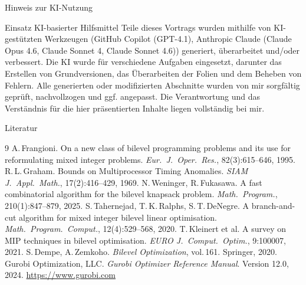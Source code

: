 \documentclass[fleqn,11pt,aspectratio=43]{beamer}
\begin{document}
\appendix

\begin{frame}{Hinweis zur KI-Nutzung}
  \begin{block}{Einsatz KI-basierter Hilfsmittel}
    Teile dieses Vortrags wurden mithilfe von KI-gestützten Werkzeugen (GitHub Copilot (GPT-4.1), Anthropic Claude (Claude Opus 4.6, Claude Sonnet 4, Claude Sonnet 4.6)) generiert, überarbeitet und/oder verbessert. Die KI wurde für verschiedene Aufgaben eingesetzt, darunter das Erstellen
    von Grundversionen, das Überarbeiten der Folien und dem Beheben von Fehlern.
    Alle generierten oder modifizierten Abschnitte wurden von mir sorgfältig geprüft, nachvollzogen und ggf.
    angepasst. Die Verantwortung und das Verständnis für die hier präsentierten Inhalte liegen vollständig bei mir.
  \end{block}
\end{frame}

\begin{frame}[allowframebreaks]{Literatur}
  \footnotesize
  \begin{thebibliography}{9}
      A.\,Frangioni. On a new class of bilevel programming problems and its use
      for reformulating mixed integer problems.
      \textit{Eur.~J.~Oper.~Res.}, 82(3):615--646, 1995.
      R.\,L.\,Graham. Bounds on Multiprocessor Timing Anomalies.
      \textit{SIAM J.\ Appl.\ Math.}, 17(2):416--429, 1969.
      N.\,Weninger, R.\,Fukasawa. A fast combinatorial algorithm for the bilevel knapsack problem.
      \textit{Math.\ Program.}, 210(1):847--879, 2025.
      S.\,Tahernejad, T.\,K.\,Ralphs, S.\,T.\,DeNegre. A branch-and-cut algorithm for mixed
      integer bilevel linear optimisation.
      \textit{Math.\ Program.\ Comput.}, 12(4):529--568, 2020.
      T.\,Kleinert et al. A survey on MIP techniques in bilevel optimisation.
      \textit{EURO J.\ Comput.\ Optim.}, 9:100007, 2021.
      S.\,Dempe, A.\,Zemkoho. \textit{Bilevel Optimization}, vol.\,161. Springer, 2020.
      Gurobi Optimization, LLC. \textit{Gurobi Optimizer Reference Manual}. Version 12.0, 2024.
      \url{https://www.gurobi.com}
  \end{thebibliography}
\end{frame}
\end{document}
